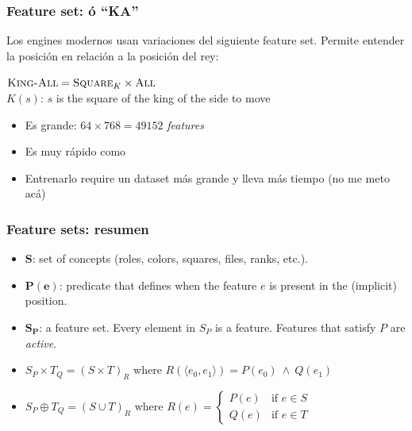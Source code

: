 \begin{frame}
\frametitle{Feature set:  ó \enquote{KA}}
Los engines modernos usan variaciones del siguiente feature set. Permite entender la posición en relación a la posición del rey:
\begin{center}
    $\textsc{King-All} = \textsc{Square}_{K} \times \textsc{All}$ \\
    $K(s)$: $s$ is the square of the king of the side to move\\
\end{center}
\begin{itemize}
    \item<2-> Es grande: $64 \times 768 = 49152$ \textit{features}
    \item<3-> Es muy rápido como 
    \item<4-> Entrenarlo require un dataset más grande y lleva más tiempo (no me meto acá)
\end{itemize}
\end{frame}

\begin{frame}
\frametitle{Feature sets: resumen}
\begin{itemize}
\item $\bm S$: set of concepts (roles, colors, squares, files, ranks, etc.).
\item $\bm{P(e)}$: predicate that defines when the feature $e$ is present in the (implicit) position.
\item ${\bm S}_{\bm P}$: a feature set. Every element in $S_P$ is a feature. Features that satisfy $P$ are \textit{active}.
\item $S_P \times T_Q={(S \times T)}_{R}$ where $R(\langle e_0, e_1 \rangle) = P(e_0)\ \land\ Q(e_1)$
\item $S_P \oplus T_Q={(S \cup T)}_R$ where $R(e) = \begin{cases}
        P(e) & \text{if } e \in S \\
        Q(e) & \text{if } e \in T
    \end{cases}
$
\end{itemize}
\end{frame}
